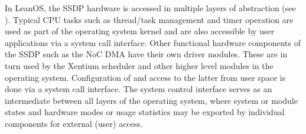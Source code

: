 In LeanOS, the \gls{SSDP} hardware is accessed in multiple layers of
abstraction (see ). Typical \gls{CPU} tasks such as thread/task
management and timer operation are used as part of the operating system kernel
and are also accessible by user applications via a system call interface.
Other functional hardware components of the \gls{SSDP} such as the \gls{NoC}
\gls{DMA} have their own driver modules. These are in turn used by the
\gls{Xentium} scheduler and other higher level modules in the operating system.
Configuration of and access to the latter from user space is done via a system
call interface. The system control interface serves as an intermediate between
all layers of the operating system, where system or module states and hardware
modes or usage statistics may be exported by individual components for external
(user) access.







